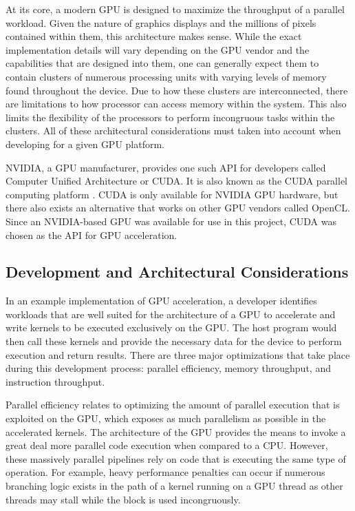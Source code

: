 \documentclass[conference, twoside]{IEEEtran}
\begin{document}
At its core, a modern GPU is designed to maximize the throughput of a parallel workload. Given the nature of graphics displays and the millions of pixels contained within them, this architecture makes sense. While the exact implementation details will vary depending on the GPU vendor and the capabilities that are designed into them, one can generally expect them to contain clusters of numerous processing units with varying levels of memory found throughout the device. Due to how these clusters are interconnected, there are limitations to how processor can access memory within the system. This also limits the flexibility of the processors to perform incongruous tasks within the clusters. All of these architectural considerations must taken into account when developing for a given GPU platform.

NVIDIA, a GPU manufacturer, provides one such API for developers called Computer Unified Architecture or CUDA. It is also known as the CUDA parallel computing platform \cite{nvidia-cuda}. CUDA is only available for NVIDIA GPU hardware, but there also exists an alternative that works on other GPU vendors called OpenCL. Since an NVIDIA-based GPU was available for use in this project, CUDA was chosen as the API for GPU acceleration.

\subsection{Development and Architectural Considerations} %

In an example implementation of GPU acceleration, a developer identifies workloads that are well suited for the architecture of a GPU to accelerate and write kernels to be executed exclusively on the GPU. The host program would then call these kernels and provide the necessary data for the device to perform execution and return results. There are three major optimizations that take place during this development process: parallel efficiency, memory throughput, and instruction throughput.

Parallel efficiency relates to optimizing the amount of parallel execution that is exploited on the GPU, which exposes as much parallelism as possible in the accelerated kernels. The architecture of the GPU provides the means to invoke a great deal more parallel code execution when compared to a CPU. However, these massively parallel pipelines rely on code that is executing the same type of operation. For example, heavy performance penalties can occur if numerous branching logic exists in the path of a kernel running on a GPU thread as other threads may stall while the block is used incongruously.
\end{document}
